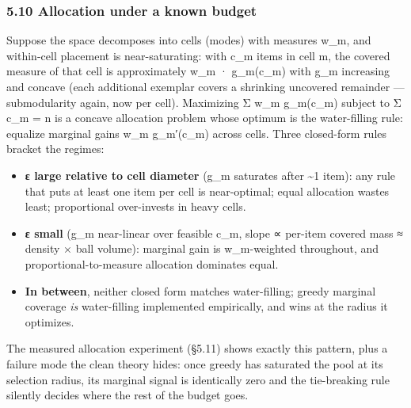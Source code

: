 \documentclass[
  10pt,
]{article}
\providecommand{\tightlist}{%
  \setlength{\itemsep}{0pt}\setlength{\parskip}{0pt}}
\theoremstyle{plain}
\theoremstyle{definition}
\providecommand{\tightlist}{\setlength{\itemsep}{0pt}\setlength{\parskip}{0pt}}
\begin{document}
\subsubsection{5.10 Allocation under a known
budget}\label{510-allocation-under-a-known-budget}

Suppose the space decomposes into cells (modes) with measures w\_m, and
within-cell placement is near-saturating: with c\_m items in cell m, the
covered measure of that cell is approximately w\_m · g\_m(c\_m) with
g\_m increasing and concave (each additional exemplar covers a shrinking
uncovered remainder --- submodularity again, now per cell). Maximizing Σ
w\_m g\_m(c\_m) subject to Σ c\_m = n is a concave allocation problem
whose optimum is the water-filling rule: equalize marginal gains w\_m
g\_m′(c\_m) across cells. Three closed-form rules bracket the regimes:

\begin{itemize}
\tightlist
\item
  \textbf{ε large relative to cell diameter} (g\_m saturates after
  \textasciitilde1 item): any rule that puts at least one item per cell
  is near-optimal; equal allocation wastes least; proportional
  over-invests in heavy cells.
\item
  \textbf{ε small} (g\_m near-linear over feasible c\_m, slope ∝
  per-item covered mass ≈ density × ball volume): marginal gain is
  w\_m-weighted throughout, and proportional-to-measure allocation
  dominates equal.
\item
  \textbf{In between}, neither closed form matches water-filling; greedy
  marginal coverage \emph{is} water-filling implemented empirically, and
  wins at the radius it optimizes.
\end{itemize}

The measured allocation experiment (§5.11) shows exactly this pattern,
plus a failure mode the clean theory hides: once greedy has saturated
the pool at its selection radius, its marginal signal is identically
zero and the tie-breaking rule silently decides where the rest of the
budget goes.
\end{document}
